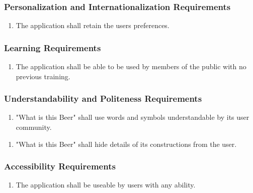 \documentclass[]{article}
\begin{document}
\subsubsection{Personalization and Internationalization Requirements}
\label{ssub:personalization_and_internationalization_requirements}
\begin{enumerate}[{UH}1. ]
	\item The application shall retain the users preferences.
\end{enumerate}

\subsubsection{Learning Requirements}
\label{ssub:learning_requirements}
\begin{enumerate}[{UH}1. ]
	\item The application shall be able to be used by members of the public with no previous training.
\end{enumerate}

\subsubsection{Understandability and Politeness Requirements}
\label{ssub:understandability_and_politeness_requirements}
\begin{enumerate}[{UH}1. ]
	\item "What is this Beer" shall use words and symbols understandable by its user community.
\end{enumerate}
\begin{enumerate}[{UH}2. ]
	\item "What is this Beer" shall hide details of its constructions from the user.
\end{enumerate}

\subsubsection{Accessibility Requirements}
\label{ssub:accessibility_requirements}
\begin{enumerate}[{UH}1. ]
	\item The application shall be useable by users with any ability.
\end{enumerate}
\end{document}

